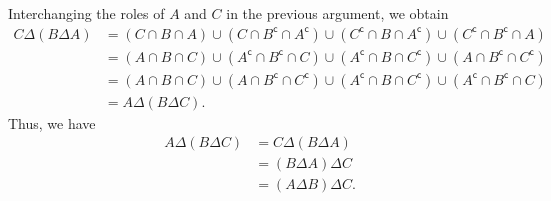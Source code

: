 \documentclass[10pt]{article}
\newcommand{\compl}{\mathsf{c}}
\begin{document}
\begin{enumerate}
        Interchanging the roles of $A$ and $C$ in the previous argument, we obtain \begin{align*}
            C \Delta (B \Delta A)
            &= (C \cap B \cap A) \cup (C \cap B^\compl \cap A^\compl) \cup
               (C^\compl \cap B \cap A^\compl) \cup (C^\compl \cap B^\compl \cap A) \\
            &= (A \cap B \cap C) \cup (A^\compl \cap B^\compl \cap C) \cup
               (A^\compl \cap B \cap C^\compl) \cup (A \cap B^\compl \cap C^\compl) \\
            &= (A \cap B \cap C) \cup (A \cap B^\compl \cap C^\compl) \cup
               (A^\compl \cap B \cap C^\compl) \cup (A^\compl \cap B^\compl \cap C) \\
            &= A \Delta (B \Delta C).
        \end{align*}
        Thus, we have \begin{align*}
            A \Delta (B \Delta C)
            &= C \Delta (B \Delta A) \\
            &= (B \Delta A) \Delta C \tag{Using $X \Delta Y = Y \Delta X$} \\
            &= (A \Delta B) \Delta C \tag{Using $X \Delta Y = Y \Delta X$}.
        \end{align*}

    \end{enumerate}


    \clearpage
\end{document}
